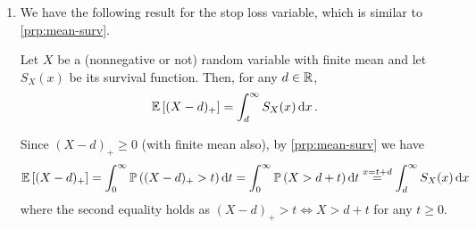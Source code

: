 \begin{enumerate}
\item We have the following result for the stop loss variable, which is
similar to \cref{prp:mean-surv}.
\begin{proposition}
\label{prp:mean-sl-surv}
Let \(X\) be a (nonnegative or not) random variable with finite mean and let
\(S_X(x)\) be its survival function. Then, for any \(d\in\mathbb{R}\),
\[
\mathbb{E}\left[(X-d)_{+}\right]=\int_{d}^{\infty}S_X(x)\dd{x}.
\]
\end{proposition}
\begin{pf}
Since \((X-d)_{+}\ge 0\) (with finite mean also), by \cref{prp:mean-surv} we have
\[
\mathbb{E}\left[(X-d)_{+}\right]=\int_{0}^{\infty}\mathbb{P}\left((X-d)_{+}>t\right)\dd{t}
=\int_{0}^{\infty}\mathbb{P}\left(X>d+t\right)\dd{t}
\overset{x=t+d}{=}\int_{d}^{\infty}S_X(x)\dd{x}
\]
where the second equality holds as \((X-d)_{+}>t\iff X>d+t\) for any \(t\ge 0\).
\begin{center}
\end{center}
\end{pf}
\end{enumerate}
